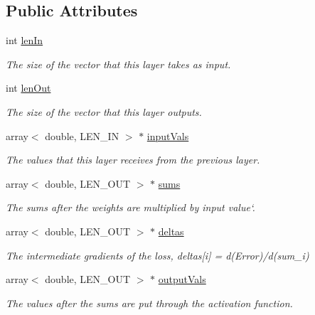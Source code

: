 \subsection*{Public Attributes}
\begin{DoxyCompactItemize}
\item 
int \hyperlink{class_layer_a844e22c542ae02cb475cabb8353300a8}{len\+In}
\begin{DoxyCompactList}\small\item\em The size of the vector that this layer takes as input. \end{DoxyCompactList}\item 
int \hyperlink{class_layer_ae10a61035ba7a18f9f2a6d1d3ebf9811}{len\+Out}
\begin{DoxyCompactList}\small\item\em The size of the vector that this layer outputs. \end{DoxyCompactList}\item 
array$<$ double, L\+E\+N\+\_\+\+IN $>$ $\ast$ \hyperlink{class_layer_a38145ae44adb77f559a0ae77dad7c6f9}{input\+Vals}
\begin{DoxyCompactList}\small\item\em The values that this layer receives from the previous layer. \end{DoxyCompactList}\item 
array$<$ double, L\+E\+N\+\_\+\+O\+UT $>$ $\ast$ \hyperlink{class_layer_aa0a3384dec407f34bf9d93994fc6613f}{sums}
\begin{DoxyCompactList}\small\item\em The sums after the weights are multiplied by input value`. \end{DoxyCompactList}\item 
array$<$ double, L\+E\+N\+\_\+\+O\+UT $>$ $\ast$ \hyperlink{class_layer_aeefbb274f205f4960c4a1a3ed5f5d807}{deltas}
\begin{DoxyCompactList}\small\item\em The intermediate gradients of the loss, {\ttfamily deltas\mbox{[}i\mbox{]} = d(\+Error)/d(sum\+\_\+i)} \end{DoxyCompactList}\item 
array$<$ double, L\+E\+N\+\_\+\+O\+UT $>$ $\ast$ \hyperlink{class_layer_a5007d0043790b288b9473ec233108482}{output\+Vals}
\begin{DoxyCompactList}\small\item\em The values after the sums are put through the activation function. \end{DoxyCompactList}\item 

\end{DoxyCompactItemize}
